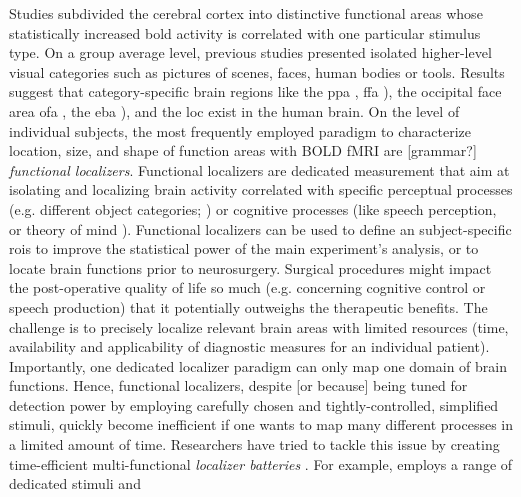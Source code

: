 Studies subdivided the cerebral cortex into distinctive functional areas whose
statistically increased \ac{bold} activity is correlated with one particular
stimulus type.
On a group average level, previous studies presented isolated higher-level
visual categories such as pictures of scenes, faces, human bodies or tools.
Results suggest that category-specific brain regions like the \ac{ppa}
\citep{epstein1998ppa}, \ac{ffa} \citep{kanwisher1997ffa}), the occipital face
area \ac{ofa} \citep{pitcher2011occipitalfacearea}, the \ac{eba}
\citep{downing2001bodyarea}), and the \ac{loc} \citet{malach1995loc} exist in
the human brain.
On the level of individual subjects, the most frequently employed paradigm to
characterize location, size, and shape of function areas with BOLD fMRI are
[grammar?] \textit{functional localizers}.
Functional localizers are dedicated measurement that aim at isolating and
localizing brain activity correlated with specific perceptual processes (e.g.
different object categories; \citet{kanwisher1997ffa}) or cognitive processes
(like speech perception, \citet{fernandez2001language} or theory of mind
\citet{spunt2014validating}).
Functional localizers can be used to define an subject-specific \acp{roi} to
improve the statistical power of the main experiment's analysis, or to locate
brain functions prior to neurosurgery.
Surgical procedures might impact the post-operative quality of life so much
(e.g. concerning cognitive control or speech production) that it potentially
outweighs the therapeutic benefits.
The challenge is to precisely localize relevant brain areas with limited
resources (time, availability and applicability of diagnostic measures for an
individual patient).
Importantly, one dedicated localizer paradigm can only map one domain of brain
functions.
Hence, functional localizers, despite [or because] being tuned for detection
power by employing carefully chosen and tightly-controlled, simplified stimuli,
quickly become inefficient if one wants to map many different processes in a
limited amount of time.
Researchers have tried to tackle this issue by creating time-efficient
multi-functional \textit{localizer batteries} \citep{barch2013function,
drobyshevsky2006rapid, pinel2007fast}.
For example, \citet{pinel2007fast} employs a range of dedicated stimuli and
